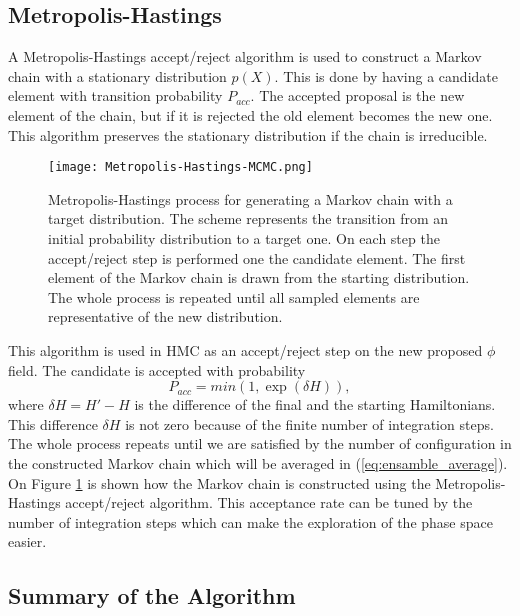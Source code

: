 \subsection{Metropolis-Hastings}

A Metropolis-Hastings accept/reject algorithm is used to construct a Markov chain with a stationary distribution $p(X)$. This is done by having a candidate element with transition probability $P_{acc}$. The accepted proposal is the new element of the chain, but if it is rejected the old element becomes the new one. This algorithm preserves the stationary distribution if the chain is irreducible.

\begin{figure}[htbp]
    \centerline{\texttt{[image: 
        Metropolis-Hastings-MCMC.png]}}
    \caption{Metropolis-Hastings process for generating a Markov chain with a target distribution. The scheme represents the transition from an initial probability distribution to a target one. On each step the accept/reject step is performed one the candidate element. The first element of the Markov chain is drawn from the starting distribution. The whole process is repeated until all sampled elements are representative of the new distribution. %
    }
    \label{fig:mn-mcmc}
\end{figure}
This algorithm is used in HMC as an accept/reject step on the new proposed $\phi$ field. The candidate is accepted with probability 
\begin{equation}
    P_{acc} = min(1, \exp(\delta H)),
\end{equation}
where $\delta H = H' - H$ is the difference of the final and the starting Hamiltonians. This difference $\delta H$ is not zero because of the finite number of integration steps. The whole process repeats until we are satisfied by the number of configuration in the constructed Markov chain which will be averaged in (\ref{eq:ensamble_average}). On Figure \ref{fig:mn-mcmc} is shown how the Markov chain is constructed using the Metropolis-Hastings accept/reject algorithm. This acceptance rate can be tuned by the number of integration steps which can make the exploration of the phase space easier.

\subsection{Summary of the Algorithm}

